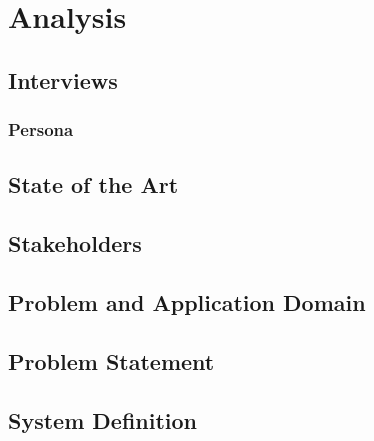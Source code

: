 \chapter{Analysis}


\section{Interviews}



\subsection{Persona}


\section{State of the Art}


\section{Stakeholders}


\section{Problem and Application Domain}


\section{Problem Statement}


\section{System Definition}

